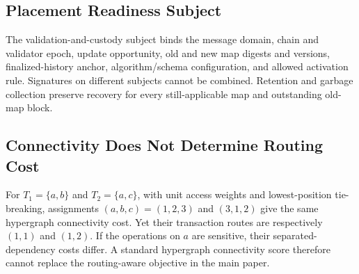 \subsection{Placement Readiness Subject}

The validation-and-custody subject binds the message domain, chain and validator epoch, update opportunity, old and new map digests and versions, finalized-history anchor, algorithm/schema configuration, and allowed activation rule. Signatures on different subjects cannot be combined. Retention and garbage collection preserve recovery for every still-applicable map and outstanding old-map block.

\subsection{Connectivity Does Not Determine Routing Cost}

For \(T_1=\{a,b\}\) and \(T_2=\{a,c\}\), with unit access weights and lowest-position tie-breaking, assignments \((a,b,c)=(1,2,3)\) and \((3,1,2)\) give the same hypergraph connectivity cost. Yet their transaction routes are respectively \((1,1)\) and \((1,2)\). If the operations on \(a\) are sensitive, their separated-dependency costs differ. A standard hypergraph connectivity score therefore cannot replace the routing-aware objective in the main paper.
